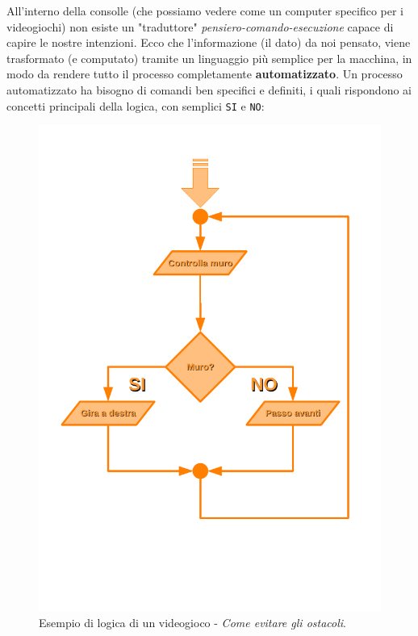 \documentclass[12pt,fleqn,a4paper]{book} %
\begin{document}
    			All'interno della consolle (che possiamo vedere come un computer specifico per i videogiochi) non esiste un "traduttore" \textit{pensiero-comando-esecuzione} capace di capire le nostre intenzioni. Ecco che l'informazione (il dato) da noi pensato, viene trasformato (e computato) tramite un linguaggio più semplice per la macchina, in modo da rendere tutto il processo completamente \textbf{automatizzato}. Un processo automatizzato ha bisogno di comandi ben specifici e definiti, i quali rispondono ai concetti principali della logica, con semplici \texttt{SI} e \texttt{NO}:
    			\begin{figure}[h!]
    				\centering\includegraphics[scale=0.7]{Diagrams/diag1}
    				\caption{Esempio di logica di un videogioco - \textit{Come evitare gli ostacoli}.}
    			\end{figure}
    		
\end{document}
